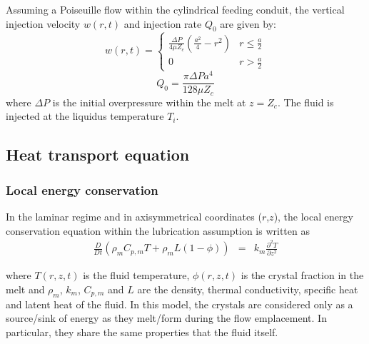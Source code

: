 Assuming a Poiseuille flow within the cylindrical feeding conduit, the
vertical  injection velocity  $w(r,t)$  and injection  rate $Q_0$  are
given by:
\begin{equation}
  w(r,t)=
  \begin{cases}
    \frac{ \Delta P}{4 \mu Z_{c}} (\frac{a^{2}}{4}-r^{2})& r \le \frac{a}{2}\\
    0 & r > \frac{a}{2}
  \end{cases}
  \label{eq12}
\end{equation}
\begin{equation}
  Q_{0}=\frac{\pi \Delta P a^{4}}{128 \mu Z_c}
  \label{eq11}
\end{equation}
where  $\Delta P$  is  the  initial overpressure  within  the melt  at
$z=Z_{c}$. The fluid is injected at the liquidus temperature $T_i$.

\subsection{Heat transport equation}
\subsubsection{Local energy conservation}

In the laminar regime and in axisymmetrical coordinates ($r$,$z$), the
local energy  conservation equation within the  lubrication assumption
is written as
\begin{eqnarray}
  \frac{D}{D t}\left(\rho_m C_{p,m} T+\rho_mL(1-\phi)\right)&=& k_m  \frac{\partial^2
                                                                T}{\partial               z^2}\label{EnergyCons}
\end{eqnarray}

where  $T(r,z,t)$  is  the  fluid temperature,  $\phi(r,z,t)$  is  the
crystal fraction  in the melt  and $\rho_m$, $k_m$, $C_{p,m}$  and $L$
are the density,  thermal conductivity, specific heat  and latent heat
of the  fluid.  In this model,  the crystals are considered  only as a
source/sink of energy  as they melt/form during  the flow emplacement.
In particular, they share the same properties that the fluid itself.

